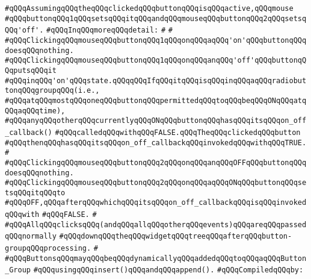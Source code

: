 \verb|#qQQqAssumingqQQqtheqQQqclickedqQQqbuttonqQQqisqQQqactive,qQQqmouse|\newline
\verb|#qQQqbuttonqQQq1qQQqsetsqQQqitqQQqandqQQqmouseqQQqbuttonqQQq2qQQqsetsqQQq'off'.|\newline
\verb|#qQQqInqQQqmoreqQQqdetail:|\newline
\verb|#|\newline
\verb|#|\newline
\verb|#qQQqClickingqQQqmouseqQQqbuttonqQQq1qQQqonqQQqaqQQq'on'qQQqbuttonqQQqdoesqQQqnothing.|\newline
\verb|#qQQqClickingqQQqmouseqQQqbuttonqQQq1qQQqonqQQqanqQQq'off'qQQqbuttonqQQqputsqQQqit|\newline
\verb|#qQQqinqQQq'on'qQQqstate.qQQqqQQqIfqQQqitqQQqisqQQqinqQQqaqQQqradiobuttonqQQqgroupqQQq(i.e.,|\newline
\verb|#qQQqatqQQqmostqQQqoneqQQqbuttonqQQqpermittedqQQqtoqQQqbeqQQqONqQQqatqQQqaqQQqtime),|\newline
\verb|#qQQqanyqQQqotherqQQqcurrentlyqQQqONqQQqbuttonqQQqhasqQQqitsqQQqon_off_callback()|\newline
\verb|#qQQqcalledqQQqwithqQQqFALSE.qQQqTheqQQqclickedqQQqbutton|\newline
\verb|#qQQqthenqQQqhasqQQqitsqQQqon_off_callbackqQQqinvokedqQQqwithqQQqTRUE.|\newline
\verb|#|\newline
\verb|#qQQqClickingqQQqmouseqQQqbuttonqQQq2qQQqonqQQqanqQQqOFFqQQqbuttonqQQqdoesqQQqnothing.|\newline
\verb|#qQQqClickingqQQqmouseqQQqbuttonqQQq2qQQqonqQQqaqQQqONqQQqbuttonqQQqsetsqQQqitqQQqto|\newline
\verb|#qQQqOFF,qQQqafterqQQqwhichqQQqitsqQQqon_off_callbackqQQqisqQQqinvokedqQQqwith|\newline
\verb|#qQQqFALSE.|\newline
\verb|#|\newline
\verb|#qQQqAllqQQqclicksqQQq(andqQQqallqQQqotherqQQqevents)qQQqareqQQqpassedqQQqnormally|\newline
\verb|#qQQqdownqQQqtheqQQqwidgetqQQqtreeqQQqafterqQQqbutton-groupqQQqprocessing.|\newline
\verb|#|\newline
\verb|#qQQqButtonsqQQqmayqQQqbeqQQqdynamicallyqQQqaddedqQQqtoqQQqaqQQqButton_Group|\newline
\verb|#qQQqusingqQQqinsert()qQQqandqQQqappend().|\newline
\newline
\verb|#qQQqCompiledqQQqby:|\newline
